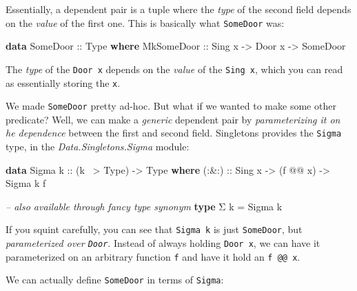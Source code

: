 \documentclass[]{article}
\newenvironment{Shaded}{}{}
\newcommand{\CommentTok}[1]{\textcolor[rgb]{0.38,0.63,0.69}{\textit{#1}}}
\newcommand{\DataTypeTok}[1]{\textcolor[rgb]{0.56,0.13,0.00}{#1}}
\newcommand{\FunctionTok}[1]{\textcolor[rgb]{0.02,0.16,0.49}{#1}}
\newcommand{\KeywordTok}[1]{\textcolor[rgb]{0.00,0.44,0.13}{\textbf{#1}}}
\newcommand{\NormalTok}[1]{#1}
\newcommand{\OtherTok}[1]{\textcolor[rgb]{0.00,0.44,0.13}{#1}}
\begin{document}
Essentially, a dependent pair is a tuple where the \emph{type} of the second
field depends on the \emph{value} of the first one. This is basically what
\texttt{SomeDoor} was:

\begin{Shaded}
\begin{Highlighting}[]
\KeywordTok{data} \DataTypeTok{SomeDoor}\OtherTok{ ::} \DataTypeTok{Type} \KeywordTok{where}
    \DataTypeTok{MkSomeDoor}\OtherTok{ ::} \DataTypeTok{Sing}\NormalTok{ x }\OtherTok{->} \DataTypeTok{Door}\NormalTok{ x }\OtherTok{->} \DataTypeTok{SomeDoor}
\end{Highlighting}
\end{Shaded}

The \emph{type} of the \texttt{Door\ x} depends on the \emph{value} of the
\texttt{Sing\ x}, which you can read as essentially storing the \texttt{x}.

We made \texttt{SomeDoor} pretty ad-hoc. But what if we wanted to make some
other predicate? Well, we can make a \emph{generic} dependent pair by
\emph{parameterizing it on he dependence} between the first and second field.
Singletons provides the \texttt{Sigma} type, in the \emph{Data.Singletons.Sigma}
module:

\begin{Shaded}
\begin{Highlighting}[]
\KeywordTok{data} \DataTypeTok{Sigma}\OtherTok{ k ::}\NormalTok{ (k }\FunctionTok{~>} \DataTypeTok{Type}\NormalTok{) }\OtherTok{->} \DataTypeTok{Type} \KeywordTok{where}
\OtherTok{    (:&:) ::} \DataTypeTok{Sing}\NormalTok{ x }\OtherTok{->}\NormalTok{ (f }\FunctionTok{@@}\NormalTok{ x) }\OtherTok{->} \DataTypeTok{Sigma}\NormalTok{ k f}

\CommentTok{-- also available through fancy type synonym}
\KeywordTok{type}\NormalTok{ Σ k }\FunctionTok{=} \DataTypeTok{Sigma}\NormalTok{ k}
\end{Highlighting}
\end{Shaded}

If you squint carefully, you can see that \texttt{Sigma\ k} is just
\texttt{SomeDoor}, but \emph{parameterized over \texttt{Door}}. Instead of
always holding \texttt{Door\ x}, we can have it parameterized on an arbitrary
function \texttt{f} and have it hold an \texttt{f\ @@\ x}.

We can actually define \texttt{SomeDoor} in terms of \texttt{Sigma}:
\end{document}
